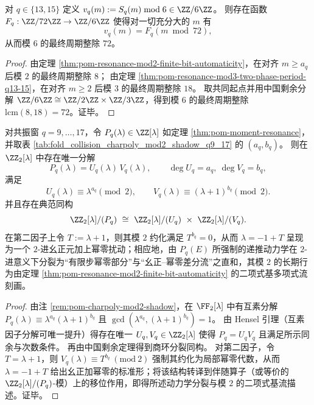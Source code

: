 \begin{theorem}\label{thm:pom-resonance-mod6-period-q13-15}
对 \(q\in\{13,15\}\) 定义 \(v_q(m):=S_q(m)\bmod 6\in\ZZ/6\ZZ\)。
则存在函数 \(F_q:\ZZ/72\ZZ\to\ZZ/6\ZZ\) 使得对一切充分大的 \(m\) 有
\[
v_q(m)=F_q(m\bmod 72),
\]
从而模 \(6\) 的最终周期整除 \(72\)。
\end{theorem}
\begin{proof}
由定理 \ref{thm:pom-resonance-mod2-finite-bit-automaticity}，在对齐 \(m\ge a_q\) 后模 \(2\) 的最终周期整除 \(8\)；
由定理 \ref{thm:pom-resonance-mod3-two-phase-period-q13-15}，在对齐 \(m\ge 2\) 后模 \(3\) 的最终周期整除 \(18\)。
取共同起点并用中国剩余分解 \(\ZZ/6\ZZ\cong\ZZ/2\ZZ\times\ZZ/3\ZZ\)，得到模 \(6\) 的最终周期整除 \(\mathrm{lcm}(8,18)=72\)。证毕。
\end{proof}

\begin{theorem}\label{thm:pom-resonance-hensel-splitting-z2}
对共振窗 \(q=9,\dots,17\)，令 \(P_q(\lambda)\in\ZZ[\lambda]\) 如定理 \ref{thm:pom-moment-resonance}，并取表 \ref{tab:fold_collision_charpoly_mod2_shadow_q9_17} 的 \((a_q,b_q)\)。
则在 \(\ZZ_2[\lambda]\) 中存在唯一分解
\[
P_q(\lambda)=U_q(\lambda)\,V_q(\lambda),
\qquad \deg U_q=a_q,\ \deg V_q=b_q,
\]
满足
\[
U_q(\lambda)\equiv \lambda^{a_q}\pmod 2,\qquad V_q(\lambda)\equiv (\lambda+1)^{b_q}\pmod 2.
\]
并且存在典范同构
\[
\ZZ_2[\lambda]/(P_q)\ \cong\ \ZZ_2[\lambda]/(U_q)\ \times\ \ZZ_2[\lambda]/(V_q).
\]
在第二因子上令 \(T:=\lambda+1\)，则其模 \(2\) 约化满足 \(T^{b_q}=0\)，从而 \(\lambda=-1+T\) 呈现为一个 \(2\)-进幺正元加上幂零扰动；相应地，由 \(P_q(E)\) 所强制的递推动力学在 \(2\)-进意义下分裂为“有限步幂零部分”与“幺正--幂零差分流”之直和，其模 \(2\) 的长期行为由定理 \ref{thm:pom-resonance-mod2-finite-bit-automaticity} 的二项式基多项式流刻画。
\end{theorem}
\begin{proof}
由注 \ref{rem:pom-charpoly-mod2-shadow}，在 \(\FF_2[\lambda]\) 中有互素分解
\(
P_q(\lambda)\equiv \lambda^{a_q}(\lambda+1)^{b_q}
\)
且 \(\gcd(\lambda^{a_q},(\lambda+1)^{b_q})=1\)。
由 Hensel 引理（互素因子分解可唯一提升）得存在唯一 \(U_q,V_q\in\ZZ_2[\lambda]\) 使得 \(P_q=U_qV_q\) 且满足所示同余与次数条件。
再由中国剩余定理得到商环分裂同构。
对第二因子，令 \(T=\lambda+1\)，则 \(V_q(\lambda)\equiv T^{b_q}\ (\mathrm{mod}\ 2)\) 强制其约化为局部幂零代数，从而 \(\lambda=-1+T\) 给出幺正加幂零的标准形；将该结构转译到伴随算子（或等价的 \(\ZZ_2[\lambda]/(P_q)\)-模）上的移位作用，即得所述动力学分裂与模 \(2\) 的二项式基流描述。证毕。
\end{proof}

